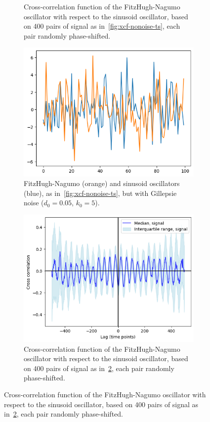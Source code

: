 \begin{figure}
\begin{subfigure}[t]{0.45\textwidth}
    \caption{
      Cross-correlation function of the FitzHugh-Nagumo oscillator with respect to the sinusoid oscillator, based on 400 pairs of signal as in~\ref{fig:xcf-nonoise-ts}, each pair randomly phase-shifted.
    }
    \label{fig:xcf-nonoise-xcf}
  \end{subfigure}

  \begin{subfigure}[t]{0.45\textwidth}
  \centering
    \includegraphics[width=\linewidth]{sinusoid_and_fitzhughnagumo_gillnoise.png}
    \caption{
      FitzHugh-Nagumo (orange) and sinusoid oscillators (blue), as in~\ref{fig:xcf-nonoise-ts}, but with Gillepsie noise ($d_{0} = 0.05$, $k_{0} = 5$).
    }
    \label{fig:xcf-gillnoise-ts}
  \end{subfigure}%
  \centering
  \begin{subfigure}[t]{0.45\textwidth}
  \centering
    \includegraphics[width=\linewidth]{randomshift_sinusoid_fitzhughnagumo_gillnoise_xcf.png}
    \caption{
      Cross-correlation function of the FitzHugh-Nagumo oscillator with respect to the sinusoid oscillator, based on 400 pairs of signal as in~\ref{fig:xcf-gillnoise-ts}, each pair randomly phase-shifted.
    }
    \label{fig:xcf-gillnoise-xcf}
  \end{subfigure}


\end{figure}
